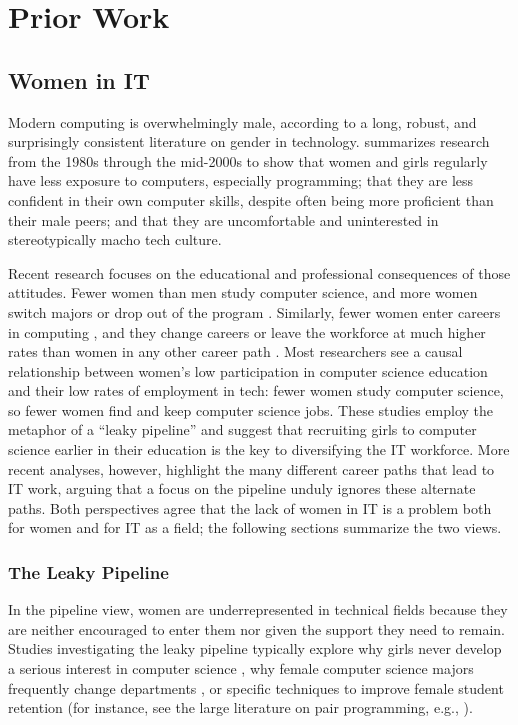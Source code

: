 \section{Prior Work}\label{sec:lit}
\subsection{Women in IT}\label{sec:lit-gender}
Modern computing is overwhelmingly male, according to a long, robust, and surprisingly consistent literature on gender in technology. \citet{Sanders2005Gender} summarizes research from the 1980s through the mid-2000s to show that women and girls regularly have less exposure to computers, especially programming; that they are less confident in their own computer skills, despite often being more proficient than their male peers; and that they are uncomfortable and uninterested in stereotypically macho tech culture.

Recent research focuses on the educational and professional consequences of those attitudes. Fewer women than men study computer science, and more women switch majors or drop out of the program \citep{Cohoon2006Just}. Similarly, fewer women enter careers in computing \citep{BartolAspray2006Transition}, and they change careers or leave the workforce at much higher rates than women in any other career path \citep{GlassEtAl2013Whats}. Most researchers see a causal relationship between women's low participation in computer science education and their low rates of employment in tech: fewer women study computer science, so fewer women find and keep computer science jobs. These studies employ the metaphor of a ``leaky pipeline'' \citep{Camp1997Incredible} and suggest that recruiting girls to computer science earlier in their education is the key to diversifying the IT workforce. More recent analyses, however, highlight the many different career paths that lead to IT work, arguing that a focus on the pipeline unduly ignores these alternate paths. Both perspectives agree that the lack of women in IT is a problem both for women and for IT as a field; the following sections summarize the two views.

\subsubsection{The Leaky Pipeline}
In the pipeline view, women are underrepresented in technical fields because they are neither encouraged to enter them nor given the support they need to remain. Studies investigating the leaky pipeline typically explore why girls never develop a serious interest in computer science \citep{BarkerEtAl2006Recruiting}, why female computer science majors frequently change departments \citep{KatzEtAl2006Traversing}, or specific techniques to improve female student retention (for instance, see the large literature on pair programming, e.g., \citealp{WernerEtAl2005Want, PorterEtAl2013Success}).

